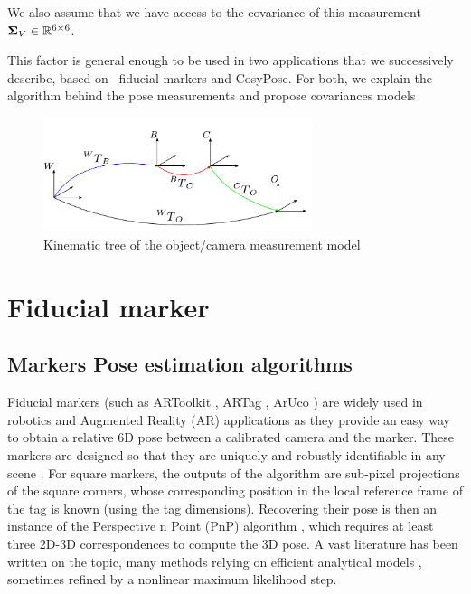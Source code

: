 We also assume that we have access to the covariance of this measurement 
\mbox{${\bm \Sigma}_V \in \mathbb{R}^{6 \times 6}$}. 

This factor is general enough to be used in two applications that we successively describe, based on \apriltag\ fiducial markers and CosyPose. For both, we explain the
algorithm behind the pose measurements and propose covariances models


\begin{figure}
    \centering
    \includegraphics[width=0.7\textwidth]{figures/kin_tree_object.pdf}
    \caption{Kinematic tree of the object/camera measurement model}
    \label{fig:camera_object_chain}
\end{figure}


%
%
\section{Fiducial marker}
\subsection{Markers Pose estimation algorithms}

Fiducial markers (such as ARToolkit \cite{kato1999marker}, ARTag \cite{fiala2005artag}, ArUco \cite{garrido2014automatic}) are widely used in robotics and Augmented Reality (AR) applications as they provide an easy way to obtain a relative 6D pose 
between a calibrated camera and the marker. These markers are designed so that they are uniquely and robustly identifiable in any scene 
\cite{wang2016iros,romero2018speeded}. For square markers, the outputs of the algorithm are sub-pixel projections of the square corners, whose 
corresponding position in the local reference frame of the tag is known (using the tag dimensions). Recovering their pose is then an instance 
of the Perspective n Point (PnP) algorithm \cite{gao2003complete}, which requires at least three 2D-3D correspondences to compute the 3D pose. 
A vast literature has been written on the topic, many methods relying on efficient analytical models
\cite{gao2003complete, lepetit2009epnp, collins2014infinitesimal, terzakis2020consistently}, sometimes refined by a nonlinear maximum likelihood step. 

